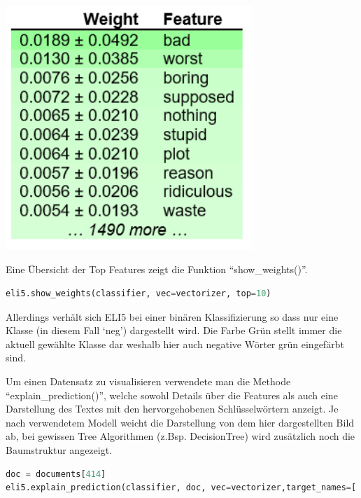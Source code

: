 \documentclass[
  12pt, %
  a4paper, %
  oneside, %
  openany, 
  numbers=noenddot, %
  BCOR=5mm, %
  parskip=half*, %
  thesis, %
]{bfhbook}
\begin{document}
\begin{center}
\begin{minipage}[t]{0.45\linewidth}
\vspace{0pt}
\centering
	\includegraphics[width=0.7\textwidth]{Bilder/MovieReviews-SentimentClassification_Weights.PNG}
\end{minipage}\hfill
\begin{minipage}[t]{0.45\linewidth}
\vspace{20pt}
Eine Übersicht der Top Features zeigt die Funktion ``show\_weights()''.
\begin{lstlisting}[language=Python]
eli5.show_weights(classifier, vec=vectorizer, top=10)
\end{lstlisting}
Allerdings verhält sich ELI5 bei einer binären Klassifizierung so dass nur eine Klasse (in diesem Fall `neg') dargestellt wird. Die Farbe Grün stellt immer die aktuell gewählte Klasse dar weshalb hier auch negative Wörter grün eingefärbt sind.
\end{minipage}
\end{center}

Um einen Datensatz zu visualisieren verwendete man die Methode ``explain\_prediction()'', welche sowohl Details über die Features als auch eine Darstellung des Textes mit den hervorgehobenen Schlüsselwörtern anzeigt. Je nach verwendetem Modell weicht die Darstellung von dem hier dargestellten Bild ab, bei gewissen Tree Algorithmen (z.Bsp. DecisionTree) wird zusätzlich noch die Baumstruktur angezeigt.
\begin{lstlisting}[language=Python]
doc = documents[414]
eli5.explain_prediction(classifier, doc, vec=vectorizer,target_names=['neg','pos'], top=20)
\end{lstlisting}
\end{document}
